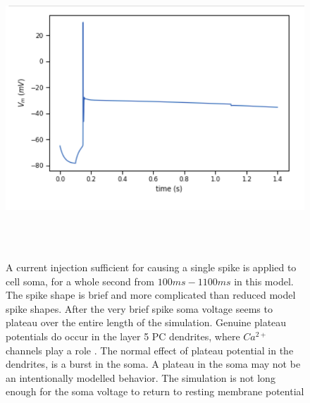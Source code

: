\begin{figure}
  \centering
    \includegraphics[scale=0.8]{figures/correct_active_l5pc.png}
    \caption[Short duration spike in the L5PC model]{A current injection sufficient for causing a single spike is applied to cell soma, for a whole second from $100ms-1100ms$ in this model. The spike shape is brief and more complicated than reduced model spike shapes. After the very brief spike soma voltage seems to plateau over the entire length of the simulation. Genuine plateau potentials do occur in the layer 5 PC dendrites, where $Ca^{2+}$ channels play a role \citep{zhu2000maturation}. The normal effect of plateau potential in the dendrites, is a burst in the soma. A plateau in the soma may not be an intentionally modelled behavior. The simulation is not long enough for the soma voltage to return to resting membrane potential}
  \label{fig:sub1}
\end{figure}

